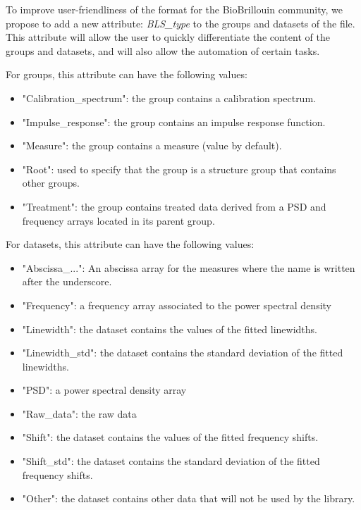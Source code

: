 To improve user-friendliness of the format for the BioBrillouin community, we propose to add a new attribute: \textit{BLS\_type} to the groups and datasets of the file. This attribute will allow the user to quickly differentiate the content of the groups and datasets, and will also allow the automation of certain tasks.

For groups, this attribute can have the following values:
\begin{itemize}
    \item "Calibration\_spectrum": the group contains a calibration spectrum.
    \item "Impulse\_response": the group contains an impulse response function.
    \item "Measure": the group contains a measure (value by default).
    \item "Root": used to specify that the group is a structure group that contains other groups.
    \item "Treatment": the group contains treated data derived from a PSD and frequency arrays located in its parent group.
\end{itemize}

For datasets, this attribute can have the following values:
\begin{itemize}
    \item "Abscissa\_...": An abscissa array for the measures where the name is written after the underscore.
    \item "Frequency": a frequency array associated to the power spectral density
    \item "Linewidth": the dataset contains the values of the fitted linewidths.
    \item "Linewidth\_std": the dataset contains the standard deviation of the fitted linewidths. 
    \item "PSD": a power spectral density array
    \item "Raw\_data": the raw data
    \item "Shift": the dataset contains the values of the fitted frequency shifts.
    \item "Shift\_std": the dataset contains the standard deviation of the fitted frequency shifts.
    \item "Other": the dataset contains other data that will not be used by the library.
\end{itemize}


